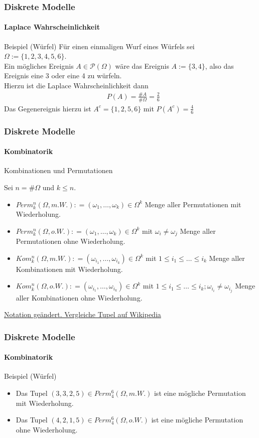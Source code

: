 \documentclass{beamer}
\begin{document}
 \begin{frame}
    \frametitle{Diskrete Modelle}
\framesubtitle{ Laplace Wahrscheinlichkeit}

\begin{block}{Beispiel (Würfel)}
Für einen einmaligen Wurf eines Würfels sei $\Omega := \{1,2,3,4,5,6\}$. \\
Ein mögliches Ereignis $A \in \mathcal{P}(\Omega)$ wäre das Ereignis $A := \{3,4\}$, also das Ereignis eine 3 oder eine 4 zu würfeln.  \\
Hierzu ist die Laplace Wahrscheinlichkeit dann 
\begin{align*}
& P(A) = \frac{ \#A}{ \# \Omega} = \frac{2}{6}
\end{align*}
Das Gegenereignis hierzu ist $A^c = \{1,2,5,6\}$ mit $P(A^c) = \frac{4}{6}$
\end{block}

 \end{frame}



\begin{frame}
    \frametitle{Diskrete Modelle}
\framesubtitle{Kombinatorik}
\begin{block}{Kombinationen und Permutationen}

Sei $n = \#\Omega$ und $k \leq n$.
\begin{itemize}
\item $Perm_k^n(\Omega, m.W.) : = ( \omega_1, \ldots, \omega_k) \in \Omega^k $  Menge aller Permutationen mit Wiederholung.
\item $Perm_k^n(\Omega, o.W.) : = ( \omega_1, \ldots, \omega_k) \in \Omega^k $ mit $ \omega_i \neq \omega_j $  Menge aller Permutationen ohne Wiederholung.
\item $Kom_k^n(\Omega, m.W.) : = ( \omega_{i_1}, \ldots, \omega_{i_k}) \in \Omega^k   $ mit $  1  \leq i_1 \leq  \ldots  \leq i_k $  Menge aller Kombinationen  mit Wiederholung.
\item $Kom_k^n(\Omega, o.W.) : = ( \omega_{i_1}, \ldots, \omega_{i_k} ) \in \Omega^k   $ mit $ 1 \leq i_1  \leq \ldots \leq i_k ;  \omega_{i_i} \neq \omega_{i_j} $  Menge aller Kombinationen  ohne  Wiederholung.
\end{itemize}
\href{https://de.wikipedia.org/wiki/Tupel}{Notation geändert. Vergleiche Tupel auf Wikipedia}
\end{block}

 \end{frame}
 
\begin{frame}
    \frametitle{Diskrete Modelle}
\framesubtitle{Kombinatorik}

\begin{block}{Beispiel (Würfel)}
\begin{itemize}
\item Das Tupel $ (3,3,2,5 )  \in Perm_4^6(\Omega, m.W.)$ ist eine mögliche Permutation mit Wiederholung.
\item Das Tupel $ (4,2,1,5 ) \in Perm_4^6(\Omega, o.W.)$ ist eine mögliche Permutation ohne Wiederholung.
\end{itemize}
\end{block}
 \end{frame}
 
\end{document}
